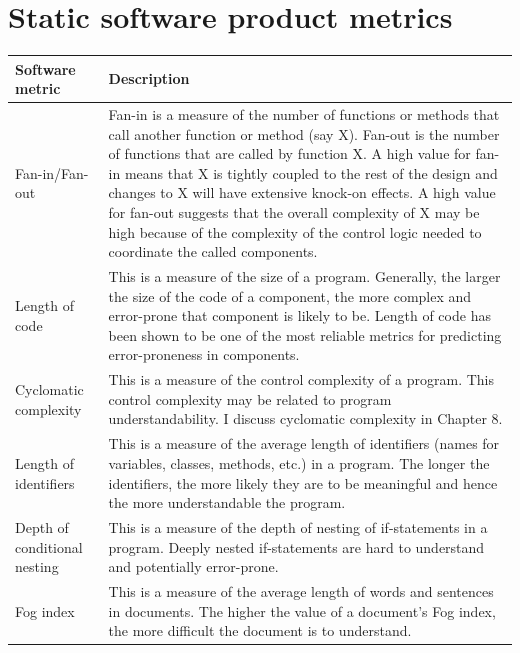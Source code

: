 \section {Static software product metrics}
\begin{table}[h!]
\centering
\begin{tabular}{ |p{3cm}|p{8cm}| }
\hline
Software metric & Description\\
\hline
\hline
Fan-in/Fan-out & Fan-in is a measure of the number of functions or methods that call another function or method (say X). Fan-out is the number of functions that are called by function X. A high value for fan-in means that X is tightly coupled to the rest of the design and changes to X will have extensive knock-on effects. A high value for fan-out suggests that the overall complexity of X may be high because of the complexity of the control logic needed to coordinate the called components.\\
\hline
Length of code & This is a measure of the size of a program. Generally, the larger the size of the code of a component, the more complex and error-prone that component is likely to be. Length of code has been shown to be one of the most reliable	metrics	for	predicting	error-proneness	in components.\\
\hline
Cyclomatic complexity & This is a measure of the control complexity of a program. This control complexity may be related to program understandability. I discuss cyclomatic complexity in Chapter 8.\\
\hline
Length of identifiers & This is a measure of the average length of identifiers (names for variables, classes, methods, etc.) in a program. The longer the identifiers, the more likely they are	to	be	meaningful	and	hence	the	more understandable the program.\\
\hline
Depth of conditional nesting & This is a measure of the depth of nesting of if-statements in a program. Deeply nested if-statements are hard to understand and potentially error-prone.\\
\hline
Fog index & This is a measure of the average length of words and sentences in documents. The higher the value of a document’s Fog index, the more difficult the document is to understand.\\
\hline
\end{tabular}

\label{table:T7_4}
\end{table}

